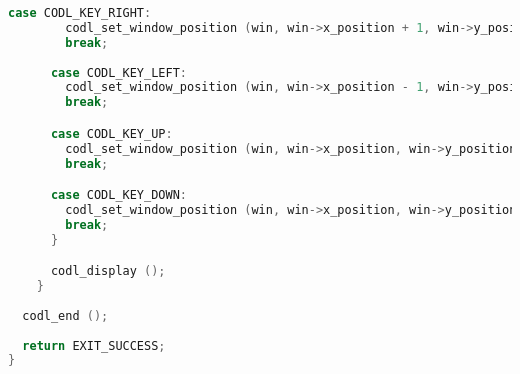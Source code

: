 \documentclass{article}
\begin{document}
\begin{lstlisting}[language=C]
      case CODL_KEY_RIGHT:
        codl_set_window_position (win, win->x_position + 1, win->y_position);
        break;
        
      case CODL_KEY_LEFT:
        codl_set_window_position (win, win->x_position - 1, win->y_position);
        break;

      case CODL_KEY_UP:
        codl_set_window_position (win, win->x_position, win->y_position - 1);
        break;

      case CODL_KEY_DOWN:
        codl_set_window_position (win, win->x_position, win->y_position + 1);
        break;
      }

      codl_display ();
    }
  
  codl_end ();
  
  return EXIT_SUCCESS;
}
\end{lstlisting}
\end{document}
